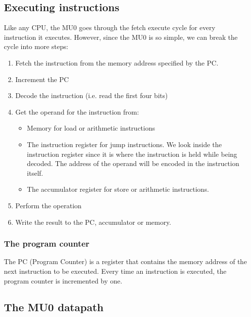 \subsection{Executing instructions}

Like any CPU, the MU0 goes through the fetch execute cycle for every instruction
it executes. However, since the MU0 is so simple, we can break the cycle into
more steps:

\begin{enumerate}

	\item Fetch the instruction from the memory address specified by the PC.

	\item Increment the PC

	\item Decode the instruction (i.e. read the first four bits)

	\item Get the operand for the instruction from:
		\begin{itemize}
			\item Memory for load or arithmetic instructions
			\item The instruction register for jump instructions. We look inside
			the instruction register since it is where the instruction is held
			while being decoded. The address of the operand will be encoded in
			the instruction itself.
			\item The accumulator register for store or arithmetic instructions.
		\end{itemize}

	\item Perform the operation

	\item Write the result to the PC, accumulator or memory.
\end{enumerate}

\subsubsection{The program counter}

The PC (Program Counter) is a register that contains the memory address of the
next instruction to be executed. Every time an instruction is executed, the
program counter is incremented by one.

\subsection{The MU0 datapath}

